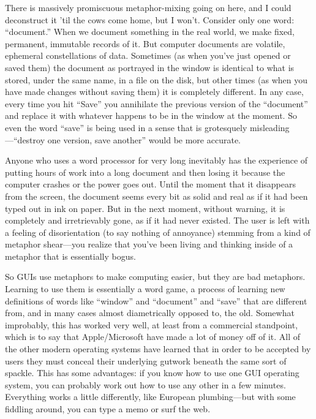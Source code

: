 \documentclass[
  fontsize=11pt,
  paper=landscape,
  twocolumn=true,
  pagesize=pdftex,
  headings=small,
  DIV=15,
  ]{scrartcl}
\begin{document}
There is massively promiscuous metaphor-mixing going on here, and I
could deconstruct it 'til the cows come home, but I won't. Consider only
one word: ``document.'' When we document something in the real world, we
make fixed, permanent, immutable records of it. But computer documents
are volatile, ephemeral constellations of data. Sometimes (as when
you've just opened or saved them) the document as portrayed in the
window is identical to what is stored, under the same name, in a file on
the disk, but other times (as when you have made changes without saving
them) it is completely different. In any case, every time you hit
``Save'' you annihilate the previous version of the ``document'' and
replace it with whatever happens to be in the window at the moment. So
even the word ``save'' is being used in a sense that is grotesquely
misleading---``destroy one version, save another'' would be more
accurate.

Anyone who uses a word processor for very long inevitably has the
experience of putting hours of work into a long document and then losing
it because the computer crashes or the power goes out. Until the moment
that it disappears from the screen, the document seems every bit as
solid and real as if it had been typed out in ink on paper. But in the
next moment, without warning, it is completely and irretrievably gone,
as if it had never existed. The user is left with a feeling of
disorientation (to say nothing of annoyance) stemming from a kind of
metaphor shear---you realize that you've been living and thinking inside
of a metaphor that is essentially bogus.

So GUIs use metaphors to make computing easier, but they are bad
metaphors. Learning to use them is essentially a word game, a process of
learning new definitions of words like ``window'' and ``document'' and
``save'' that are different from, and in many cases almost diametrically
opposed to, the old. Somewhat improbably, this has worked very well, at
least from a commercial standpoint, which is to say that Apple/Microsoft
have made a lot of money off of it. All of the other modern operating
systems have learned that in order to be accepted by users they must
conceal their underlying gutwork beneath the same sort of spackle. This
has some advantages: if you know how to use one GUI operating system,
you can probably work out how to use any other in a few minutes.
Everything works a little differently, like European plumbing---but with
some fiddling around, you can type a memo or surf the web.
\end{document}
